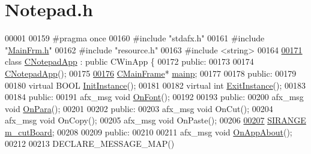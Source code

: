\hypertarget{_notepad_8h_source}{}\section{Notepad.\+h}
\label{_notepad_8h_source}

\begin{DoxyCode}
00001 
00159 \textcolor{preprocessor}{#pragma once}
00160 \textcolor{preprocessor}{#include "stdafx.h"}
00161 \textcolor{preprocessor}{#include "\hyperlink{_main_frm_8h}{MainFrm.h}"}
00162 \textcolor{preprocessor}{#include "resource.h"}
00163 \textcolor{preprocessor}{#include <string>}
00164 
\hyperlink{class_c_notepad_app}{00171} \textcolor{keyword}{class }\hyperlink{class_c_notepad_app}{CNotepadApp} : \textcolor{keyword}{public} CWinApp \{
00172 \textcolor{keyword}{public}:
00173 
00174     \hyperlink{class_c_notepad_app_a829ed77997eb81496b815b50657ecb40}{CNotepadApp}();
00175 
\hyperlink{class_c_notepad_app_a9eee0a246d98c97f2554d5bd292bf3f1}{00176}     \hyperlink{class_c_main_frame}{CMainFrame}* \hyperlink{class_c_notepad_app_a9eee0a246d98c97f2554d5bd292bf3f1}{mainp};
00177 
00178 \textcolor{keyword}{public}:
00179 
00180     \textcolor{keyword}{virtual} BOOL \hyperlink{class_c_notepad_app_a31874d4fcf2e5120379146e61d8716d4}{InitInstance}();
00181 
00182     \textcolor{keyword}{virtual} \textcolor{keywordtype}{int} \hyperlink{class_c_notepad_app_a07647790b646bc0be54fbf39e069ddcd}{ExitInstance}();
00183 
00184 \textcolor{keyword}{public}:
00191     afx\_msg \textcolor{keywordtype}{void} \hyperlink{class_c_notepad_app_aa09334de95a65c56cdca8a682b006bb6}{OnFont}();
00192 
00193 \textcolor{keyword}{public}:
00200     afx\_msg \textcolor{keywordtype}{void} \hyperlink{class_c_notepad_app_a954649ecbb87fb8a001f2ed399440261}{OnPara}();
00201 
00202 \textcolor{keyword}{public}:
00203     afx\_msg \textcolor{keywordtype}{void} OnCut();
00204     afx\_msg \textcolor{keywordtype}{void} OnCopy();
00205     afx\_msg \textcolor{keywordtype}{void} OnPaste();
00206 
\hyperlink{class_c_notepad_app_a7659b246dc9d6690527694f35d31416f}{00207}     \hyperlink{struct_s_i_r_a_n_g_e}{SIRANGE} \hyperlink{class_c_notepad_app_a7659b246dc9d6690527694f35d31416f}{m\_cutBoard}; 
00208 
00209 \textcolor{keyword}{public}:
00210 
00211     afx\_msg \textcolor{keywordtype}{void} \hyperlink{class_c_notepad_app_a40ce59e5a4884458f47b49b80497683a}{OnAppAbout}();
00212 
00213     DECLARE\_MESSAGE\_MAP()

\end{DoxyCode}
